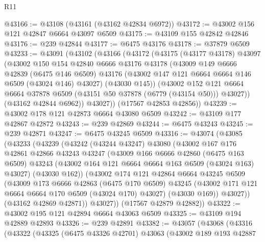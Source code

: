 \begin{lexlean}{R11}
\begin{coremodule}
@43166 := @43108 (@43161 (@43162 @42834 @6972))
@43172 := @43002 @156 @121 @42847 @6664 @43097 @6509
@43175 := @43109 @155 @42842 @42846
@43176 := @239 @42844
@43177 := @6475 @43176
@43178 := @37879 @6509
@43233 := @43091
    (@43102
      (@43166
        (@43172
          (@43175
            (@43177 @43178)
            @43097
            (@43002
              @150
              @154
              @42840
              @6666
              @43176
              @43178
              (@43009
                @149
                @6666
                @42839
                (@6475 @146 @6509)
                @43176
                (@43002 @147 @121 @6664 @6664 @146 @6509 (@43024 @146) @43027)
                (@43030 @145))
              (@43002
                @152
                @121
                @6664
                @6664
                @37878
                @6509
                (@43151 @50 @37878 (@6779 (@43154 @50)))
                @43027))
            (@43162 @42844 @6962))
          @43027))
      (@17567 @42853 @42856))
@43239 := @43002 @178 @121 @42873 @6664 @43080 @6509
@43242 := @43109 @177 @42867 @42872
@43243 := @239 @42869
@43244 := @6475 @43243
@43245 := @239 @42871
@43247 := @6475 @43245 @6509
@43316 := @43074
    (@43085
      (@43233
        (@43239
          (@43242
            (@43244 @43247)
            @43080
            (@43002
              @167
              @176
              @42861
              @42866
              @43243
              @43247
              (@43009
                @166
                @6666
                @42860
                (@6475 @163 @6509)
                @43243
                (@43002 @164 @121 @6664 @6664 @163 @6509 (@43024 @163) @43027)
                (@43030 @162))
              (@43002
                @174
                @121
                @42864
                @6664
                @43245
                @6509
                (@43009
                  @173
                  @6666
                  @42863
                  (@6475 @170 @6509)
                  @43245
                  (@43002 @171 @121 @6664 @6664 @170 @6509 (@43024 @170) @43027)
                  (@43030 @169))
                @43027))
            (@43162 @42869 @42871))
          @43027))
      (@17567 @42879 @42882))
@43322 := @43002 @195 @121 @42894 @6664 @43063 @6509
@43325 := @43109 @194 @42889 @42893
@43326 := @239 @42891
@43382 := @43057
    (@43068
      (@43316
        (@43322
          (@43325
            (@6475 @43326 @42701)
            @43063
            (@43002
              @189
              @193
              @42887

\end{coremodule}
\end{lexlean}
